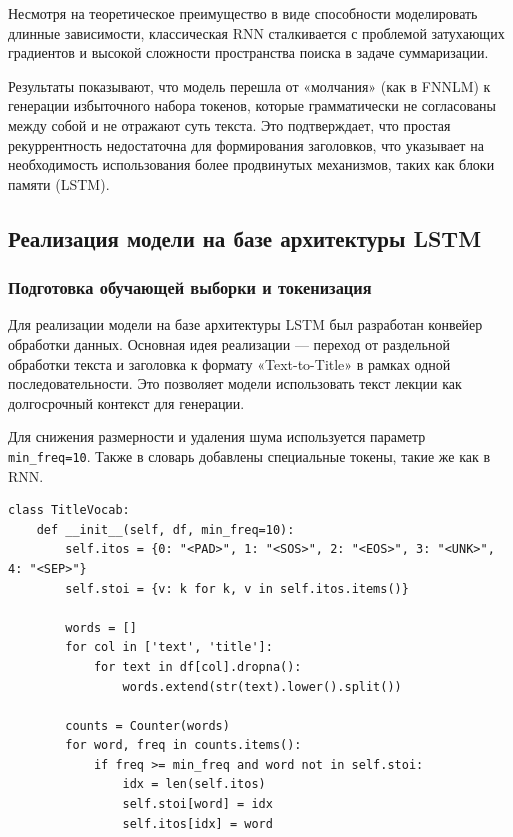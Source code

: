 \documentclass[coursework]{SCWorks}
\begin{document}
    Несмотря на теоретическое преимущество в виде способности моделировать длинные зависимости, классическая RNN сталкивается с проблемой затухающих градиентов и высокой сложности пространства поиска в задаче суммаризации.

    Результаты показывают, что модель перешла от «молчания» (как в FNNLM) к генерации избыточного набора токенов, которые грамматически не согласованы между собой и не отражают суть текста.
    Это подтверждает, что простая рекуррентность недостаточна для формирования заголовков,
    что указывает на необходимость использования более продвинутых механизмов,
    таких как блоки памяти (LSTM).

    \subsection{Реализация модели на базе архитектуры LSTM}

    \subsubsection{Подготовка обучающей выборки и токенизация}

    Для реализации модели на базе архитектуры LSTM был разработан конвейер обработки данных.
    Основная идея реализации — переход от раздельной обработки текста и заголовка к формату «Text-to-Title»
    в рамках одной последовательности.
    Это позволяет модели использовать текст лекции как долгосрочный контекст для генерации.

    Для снижения размерности и удаления шума используется параметр \\ \texttt{min\_freq=10}.
    Также в словарь добавлены специальные токены, такие же как в RNN.

    \begin{verbatim}
class TitleVocab:
    def __init__(self, df, min_freq=10):
        self.itos = {0: "<PAD>", 1: "<SOS>", 2: "<EOS>", 3: "<UNK>", 4: "<SEP>"}
        self.stoi = {v: k for k, v in self.itos.items()}

        words = []
        for col in ['text', 'title']:
            for text in df[col].dropna():
                words.extend(str(text).lower().split())

        counts = Counter(words)
        for word, freq in counts.items():
            if freq >= min_freq and word not in self.stoi:
                idx = len(self.itos)
                self.stoi[word] = idx
                self.itos[idx] = word
    \end{verbatim}
\end{document}
